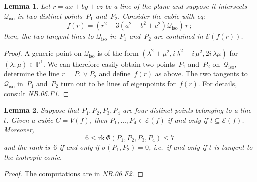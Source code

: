 \documentclass[a4paper, 11pt, reqno]{amsart}
\theoremstyle{plain}
\newtheorem{lemma}{Lemma}[section]
\theoremstyle{definition}
\newcommand{\p}{\mathbb{P}}
\newcommand{\nb}[2]{\textsl{{NB}.{#1}.{#2}}}
\newcommand{\iii}{\textit{i}\,}
\newcommand{\rk}{\ensuremath{\mathrm{rk}}}
\newcommand{\iso}{\mathcal{Q}_{\mathrm{iso}}}
\newcommand{\Eig}[1]{\mathcal{E}\!\left( {#1} \right)}
\begin{document}
\begin{lemma}
\label{lemma:twoTangentsCiso} Let $r = ax+by+cz$ be a line of the plane 
and suppose it intersects $\iso$ in two
distinct points~$P_1$ and~$P_2$. Consider the cubic with eq:
\begin{equation}
\label{eq:2_lines_of_eigenpoints}
  f(r) = \left( r^2-3\left(a^2+b^2+c^2\right)\iso \right) \, r \,;
\end{equation}
then, the two tangent lines to $\iso$ in~$P_1$ and~$P_2$
are contained in $\Eig {f(r)}$.
\end{lemma}
\begin{proof}
A generic point on $\iso$ is of the form $(\lambda^2 + \mu^2, 
\iii\lambda^2 -\iii\mu^2, 2\iii\lambda \mu)$ for $(\lambda: \mu) \in \p^1$.
We can therefore easily obtain two points~$P_1$ and~$P_2$ on~$\iso$,
determine the line $r = P_1 \vee P_2$ and define~$f(r)$ as above.
The two tangents to~$\iso$ in~$P_1$ and~$P_2$ turn out to be lines of eigenpoints
for~$f(r)$. For details, consult \nb{06}{F1}.
\end{proof}


\begin{lemma}
\label{lemma:four_points_on_line}
Suppose that $P_1, P_2, P_3, P_4$ are four distinct points belonging to a line~$t$.
Given a cubic $C=V(f)$, then $P_1, \dotsc, P_4 \in \Eig{f}$ if and only if
$t \subseteq \Eig{f}$.
Moreover,
%
\begin{equation*}
  6 \leq \rk \,\Phi(P_1, P_2, P_3, P_4) \leq 7
\end{equation*}
%
and the rank is~$6$ if and only if $\sigma(P_1, P_2) = 0$, i.e.\ if
and only if $t$ is tangent to the isotropic conic.
\end{lemma}
\begin{proof}
The computations are in \nb{06}{F2}.
\end{proof}
\end{document}

